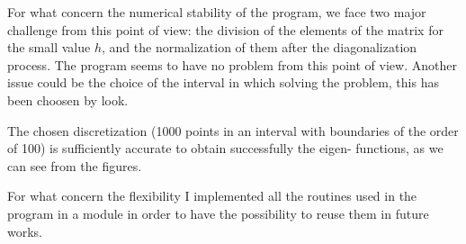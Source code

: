 \documentclass[prb,9pt,notitlepage]{revtex4-1}
\begin{document}
For what concern the numerical stability of the program, we face two major challenge from this point of view: the division of the elements of the matrix for the small value $h$, and the normalization of them after the diagonalization process. The program seems to have no problem from this point of view. Another issue could be the choice of the interval in which solving the problem, this has been choosen by look.

The chosen discretization (1000 points in an interval with boundaries of the order of 100) is sufficiently accurate to obtain successfully the eigen- functions, as we can see from the figures.

For what concern the flexibility I implemented all the routines used in the program in a module in order to have the possibility to reuse them in future works.
\end{document}
